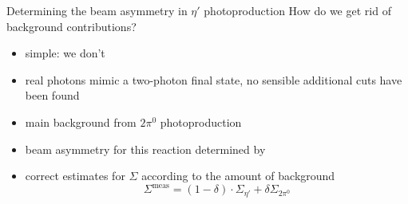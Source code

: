 \documentclass[11pt,aspectratio=169,dvipsnames]{beamer}
\begin{document}
\begin{frame}{Determining the beam asymmetry in $\eta'$ photoproduction}
	How do we get rid of background contributions?
	\begin{itemize}
		\pause
		\item simple: we don't
		\item real photons mimic a two-photon final state, no sensible additional cuts have been found
		\pause
		\item main background from $2\pi^0$ photoproduction
		\item beam asymmetry for this reaction determined by {\cites{mahlbergphd}}
		\item correct estimates for $\Sigma$ according to the amount of background
		$$\Sigma^\text{meas}=(1-\delta)\cdot\Sigma_{\eta'}+\delta\Sigma_{2\pi^0}$$
	\end{itemize}
\end{frame}
\end{document}
